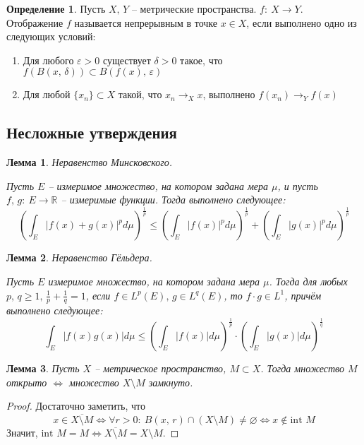 \documentclass[a4paper,12pt]{article}
\renewcommand{\leq}{\ensuremath{\leqslant}}
\renewcommand{\geq}{\ensuremath{\geqslant}}
\renewcommand{\emptyset}{\ensuremath{\varnothing}}
\theoremstyle{plain}
\newtheorem{lemma}{Лемма}[section]
\theoremstyle{definition}
\newtheorem{definition}{Определение}[section]
\theoremstyle{remark}
\begin{document}
\begin{definition}
  Пусть $X,\, Y$ -- метрические пространства. $f :\: X \to Y$. Отображение $f$ называется непрерывным в точке $x \in X$, если выполнено одно из следующих условий:
  \begin{enumerate}
    \item Для любого $\varepsilon > 0$ существует $\delta > 0$ такое, что $f(B(x,\, \delta)) \subset B(f(x),\, \varepsilon)$
    \item Для любой $\{x_n\} \subset X$ такой, что $x_n \to_X x$, выполнено $f(x_n) \to_Y f(x)$
  \end{enumerate}
\end{definition}

\subsection{Несложные утверждения}

\begin{lemma}
  Неравенство Минсковского.

  Пусть $E$ -- измеримое множество, на котором задана мера $\mu$, и пусть $f,\,g :\: E \to \mathbb{R}$ -- измеримые функции. Тогда выполнено следующее:
  \[
    \left(\int_E \vert f(x) + g(x)\vert^pd\mu\right)^{\frac{1}{p}} \leq \left(\int_E \vert f(x)\vert^p d\mu\right)^{\frac{1}{p}} + \left(\int_E \vert g(x)\vert^pd\mu\right)^{\frac{1}{p}}
  \]
\end{lemma}

\begin{lemma}
  Неравенство Гёльдера.

  Пусть $E$ измеримое множество, на котором задана мера $\mu$. Тогда для любых $p,\,q \geq 1,\, \frac{1}{p} + \frac{1}{q} = 1$, если $f \in L^p(E),\, g \in L^q(E)$, то $f \cdot g \in L^1$, причём выполнено следующее:
  \[
    \int_E \vert f(x)g(x) \vert d\mu \leq \left(\int_E \vert f(x)\vert d\mu\right)^{\frac{1}{p}} \cdot \left(\int_E \vert g(x) \vert d\mu\right)^{\frac{1}{q}}
  \]
\end{lemma}

\begin{lemma}
  Пусть $X$ -- метрическое пространство, $M \subset X$. Тогда множество $M$ открыто $\Leftrightarrow$ множество $X \setminus M$ замкнуто.
\end{lemma}

\begin{proof}
  Достаточно заметить, что
  \[
    x \in \overline{X \setminus M} \Leftrightarrow \forall r > 0 :\: B(x,\, r) \cap (X \setminus M) \neq \emptyset \Leftrightarrow x \not\in \text{int }M
  \]
  Значит, $\text{int }M = M \Leftrightarrow \overline{X \setminus M} = X \setminus M$.
\end{proof}
\end{document}
